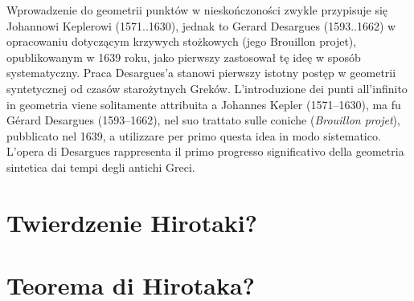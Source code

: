 Wprowadzenie do geometrii punktów w nieskończoności zwykle przypisuje się Johannowi Keplerowi (1571..1630), jednak to Gerard Desargues (1593..1662) w opracowaniu dotyczącym krzywych stożkowych (jego Brouillon projet), opublikowanym w 1639 roku, jako pierwszy zastosował tę ideę w sposób systematyczny. Praca Desargues’a stanowi pierwszy istotny postęp w geometrii syntetycznej od czasów starożytnych Greków. %
L'introduzione dei punti all'infinito in geometria viene solitamente attribuita a Johannes Kepler (1571--1630), ma fu Gérard Desargues (1593--1662), nel suo trattato sulle coniche (\emph{Brouillon projet}), pubblicato nel 1639, a utilizzare per primo questa idea in modo sistematico. L'opera di Desargues rappresenta il primo progresso significativo della geometria sintetica dai tempi degli antichi Greci. %


 
 






\section{Twierdzenie Hirotaki?} %
\section{Teorema di Hirotaka?} %


%